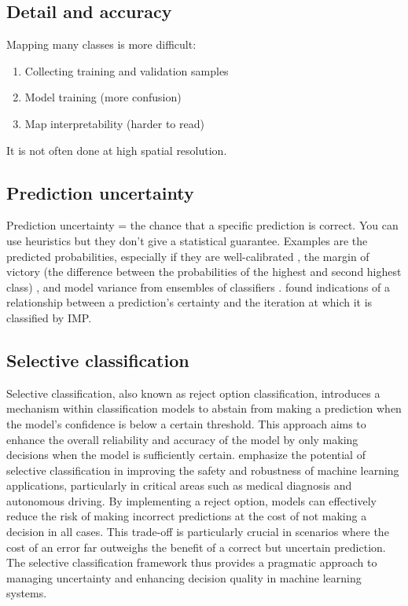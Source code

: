     \subsection{Detail and accuracy}
        
        Mapping many classes is more difficult:
        \begin{enumerate}
        \item Collecting training and validation samples
        \item Model training (more confusion)
        \item Map interpretability (harder to read)
        \end{enumerate}
        It is not often done at high spatial resolution.

    \subsection{Prediction uncertainty}
        Prediction uncertainty = the chance that a specific prediction is correct.
        You can use heuristics but they don't give a statistical guarantee. Examples are the predicted probabilities, especially if they are well-calibrated \citep{niculescu2005predicting}, the margin of victory (the difference between the probabilities of the highest and second highest class) \citep{calderon-loor2021high}, and model variance from ensembles of classifiers \citep{witjes2022spatiotemporal}. \citet{witjes2024iterative} found indications of a relationship between a prediction's certainty and the iteration at which it is classified by IMP.

    \subsection{Selective classification}
        Selective classification, also known as reject option classification, introduces a mechanism within classification models to abstain from making a prediction when the model's confidence is below a certain threshold. This approach aims to enhance the overall reliability and accuracy of the model by only making decisions when the model is sufficiently certain. \citet{geifman2017selective} emphasize the potential of selective classification in improving the safety and robustness of machine learning applications, particularly in critical areas such as medical diagnosis and autonomous driving. By implementing a reject option, models can effectively reduce the risk of making incorrect predictions at the cost of not making a decision in all cases. This trade-off is particularly crucial in scenarios where the cost of an error far outweighs the benefit of a correct but uncertain prediction. The selective classification framework thus provides a pragmatic approach to managing uncertainty and enhancing decision quality in machine learning systems.

